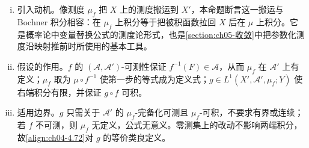 \documentclass[../../main.tex]{subfiles}%
\begin{document}
\begin{remark}
\begin{enumerate}[(i)]
\item 引入动机。像测度 $\mu_f$ 把 $X$ 上的测度搬运到 $X'$，本命题断言这一搬运与 Bochner 积分相容：在 $\mu_f$ 上积分等于把被积函数拉回 $X$ 后在 $\mu$ 上积分。它是概率论中变量替换公式的测度论形式，也是\cref{section:ch05-收敛}中把参数化测度沿映射推前时所使用的基本工具。

\item 假设的作用。$f$ 的 $(\mathcal{A},\mathcal{A}')$-可测性保证 $f^{-1}(F)\in\mathcal{A}$，从而 $\mu_f$ 在 $\mathcal{A}'$ 上有定义；$\mu_f$ 取为 $\mu\circ f^{-1}$ 使第一步的等式成为定义式；$g\in L^1(X',\mathcal{A}',\mu_f;Y)$ 使右端积分有限，并保证 $g\circ f$ 可积。

\item 适用边界。$g$ 只需关于 $\mathcal{A}'$ 的 $\mu_f$-完备化可测且 $\mu_f$-可积，不要求有界或连续；若 $f$ 不可测，则 $\mu_f$ 无定义，公式无意义。零测集上的改动不影响两端积分，故\eqref{align:ch04-4.72}对 $g$ 的等价类良定义。
\end{enumerate}
\end{remark}
\end{document}
